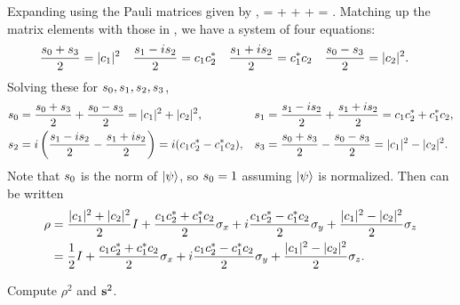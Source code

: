 \begin{solution}
	Expanding  using the Pauli matrices given by ,
	\beq
		\rho =   +  \mqty[ 0 & \sq \\ \sq & 0 ] +  \mqty[ 0 & -\sw \\ \sw & 0 ] +  \mqty[ \se & 0 \\ 0 & -\se ]
		=  .
	\eeq
	Matching up the matrix elements with those in , we have a system of four equations:
	\begin{align*}
		\frac{s_0 + s_3}{2} &= |c_1|^2 &
		\frac{s_1 - i s_2}{2} &= c_1 c_2^* &
		\frac{s_1 + i s_2}{2} &= c_1^* c_2 &
		\frac{s_0 - s_3}{2} &= |c_2|^2.
	\end{align*}
	Solving these for $s_0, s_1, s_2, s_3$,
	\begin{align}
		s_0 &= \frac{s_0 + s_3}{2} + \frac{s_0 - s_3}{2}
		= |c_1|^2 + |c_2|^2, &
		s_1 &= \frac{s_1 - i s_2}{2} + \frac{s_1 + i s_2}{2}
		= c_1 c_2^* + c_1^* c_2, \label{scomp} \\
		s_2 &= i \left( \frac{s_1 - i s_2}{2} - \frac{s_1 + i s_2}{2} \right)
		= i (c_1 c_2^* - c_1^* c_2), &
		s_3 &= \frac{s_0 + s_3}{2} - \frac{s_0 - s_3}{2}
		= |c_1|^2 - |c_2|^2. \label{scomp2}
	\end{align}
	Note that $s_0$ is the norm of $\ket{\psi}$, so $s_0 = 1$ assuming $\ket{\psi}$ is normalized.  Then  can be written
	\begin{align*}
		\rho &= \frac{|c_1|^2 + |c_2|^2}{2} I + \frac{c_1 c_2^* + c_1^* c_2}{2} \sigma_x + i \frac{c_1 c_2^* - c_1^* c_2}{2} \sigma_y + \frac{|c_1|^2 - |c_2|^2}{2} \sigma_z \\
		&= \frac{1}{2} I + \frac{c_1 c_2^* + c_1^* c_2}{2} \sigma_x + i \frac{c_1 c_2^* - c_1^* c_2}{2} \sigma_y + \frac{|c_1|^2 - |c_2|^2}{2} \sigma_z.
	\end{align*}
\vfix
\end{solution}

\begin{problem}
	Compute $\rho^2$ and $\mathbf{s}^2$.
\end{problem}

